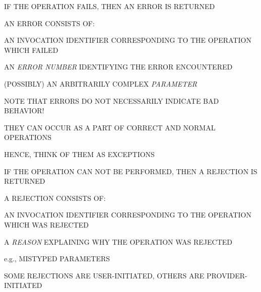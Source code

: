 \begin{bwslide}

\begin{nrtc}
\item	IF THE OPERATION FAILS, THEN AN ERROR IS RETURNED

\item	AN ERROR CONSISTS OF:
    \begin{nrtc}
    \item	AN INVOCATION IDENTIFIER CORRESPONDING TO THE OPERATION WHICH
		FAILED

    \item	AN \emph{ERROR NUMBER} IDENTIFYING THE ERROR ENCOUNTERED

    \item	(POSSIBLY) AN ARBITRARILY COMPLEX \emph{PARAMETER}
    \end{nrtc}

\item	NOTE THAT ERRORS DO NOT NECESSARILY INDICATE BAD BEHAVIOR!
    \begin{nrtc}
    \item	THEY CAN OCCUR AS A PART OF CORRECT AND NORMAL OPERATIONS

	\item	HENCE, THINK OF THEM AS EXCEPTIONS
    \end{nrtc}
\end{nrtc}
\end{bwslide}


\begin{bwslide}

\begin{nrtc}
\item	IF THE OPERATION CAN NOT BE PERFORMED, THEN A REJECTION IS RETURNED

\item	A REJECTION CONSISTS OF:
    \begin{nrtc}
    \item	AN INVOCATION IDENTIFIER CORRESPONDING TO THE OPERATION WHICH
		WAS REJECTED

    \item	A \emph{REASON} EXPLAINING WHY THE OPERATION WAS REJECTED
	\begin{nrtc}
	\item	e.g., MISTYPED PARAMETERS
	\end{nrtc}
    \end{nrtc}

\item	SOME REJECTIONS ARE USER-INITIATED, OTHERS ARE PROVIDER-INITIATED
\end{nrtc}
\end{bwslide}


